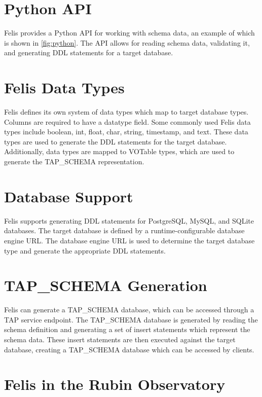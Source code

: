 \documentclass[11pt,twoside]{article}
\begin{document}
\section{Python API}


Felis provides a Python API for working with schema data, an example of which is shown in \ref{fig:python}.
The API allows for reading schema data, validating it, and generating DDL statements for a target database.

\section{Felis Data Types}

Felis defines its own system of data types which map to target database types.
Columns are required to have a datatype field.
Some commonly used Felis data types include boolean, int, float, char, string, timestamp, and text.
These data types are used to generate the DDL statements for the target database.
Additionally, data types are mapped to VOTable types, which are used to generate the TAP\_SCHEMA representation.

\section{Database Support}

Felis supports generating DDL statements for PostgreSQL, MySQL, and SQLite databases.
The target database is defined by a runtime-configurable database engine URL.
The database engine URL is used to determine the target database type and generate the appropriate DDL statements.

\section{TAP\_SCHEMA Generation}

Felis can generate a TAP\_SCHEMA database, which can be accessed through a TAP service endpoint.
The TAP\_SCHEMA database is generated by reading the schema definition and generating a set of insert statements which represent the schema data.
These insert statements are then executed against the target database, creating a TAP\_SCHEMA database which can be accessed by clients.

\section{Felis in the Rubin Observatory}
\end{document}
